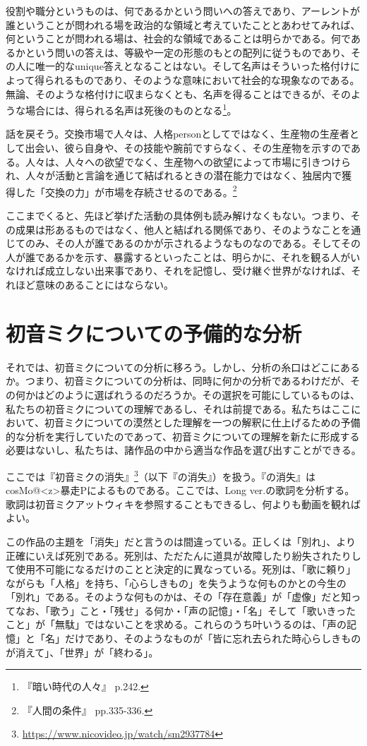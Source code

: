 \documentclass[b5j,twoside,twocolumn]{utarticle}
\begin{document}
役割や職分というものは、何であるかという問いへの答えであり、アーレントが誰ということが問われる場を政治的な領域と考えていたこととあわせてみれば、何ということが問われる場は、社会的な領域であることは明らかである。何であるかという問いの答えは、等級や一定の形態のもとの配列に従うものであり、その人に唯一的なunique答えとなることはない。そして名声はそういった格付けによって得られるものであり、そのような意味において社会的な現象なのである。無論、そのような格付けに収まらなくとも、名声を得ることはできるが、そのような場合には、得られる名声は死後のものとなる\footnote{『暗い時代の人々』 p.242.}。


話を戻そう。交換市場で人々は、人格personとしてではなく、生産物の生産者として出会い、彼ら自身や、その技能や腕前ですらなく、その生産物を示すのである。人々は、人々への欲望でなく、生産物への欲望によって市場に引きつけられ、人々が活動と言論を通じて結ばれるときの潜在能力ではなく、独居内で獲得した「交換の力」が市場を存続させるのである。\footnote{『人間の条件』 pp.335-336.}


ここまでくると、先ほど挙げた活動の具体例も読み解けなくもない。つまり、その成果は形あるものではなく、他人と結ばれる関係であり、そのようなことを通じてのみ、その人が誰であるのかが示されるようなものなのである。そしてその人が誰であるかを示す、暴露するといったことは、明らかに、それを観る人がいなければ成立しない出来事であり、それを記憶し、受け継ぐ世界がなければ、それほど意味のあることにはならない。


\section{初音ミクについての予備的な分析}
それでは、初音ミクについての分析に移ろう。しかし、分析の糸口はどこにあるか。つまり、初音ミクについての分析は、同時に何かの分析であるわけだが、その何かはどのように選ばれうるのだろうか。その選択を可能にしているものは、私たちの初音ミクについての理解であるし、それは前提である。私たちはここにおいて、初音ミクについての漠然とした理解を一つの解釈に仕上げるための予備的な分析を実行していたのであって、初音ミクについての理解を新たに形成する必要はないし、私たちは、諸作品の中から適当な作品を選び出すことができる。


ここでは『初音ミクの消失』\footnote{\url{https://www.nicovideo.jp/watch/sm2937784}}（以下『の消失』）を扱う。『の消失』はcosMo@\pbox<z>{暴走}Pによるものである。ここでは、Long ver.の歌詞を分析する。歌詞は初音ミクアットウィキを参照することもできるし、何よりも動画を観ればよい。


この作品の主題を「消失」だと言うのは間違っている。正しくは「別れ」、より正確にいえば死別である。死別は、ただたんに道具が故障したり紛失されたりして使用不可能になるだけのことと決定的に異なっている。死別は、「歌に頼り」ながらも「人格」を持ち、「心らしきもの」を失うような何ものかとの今生の「別れ」である。そのような何ものかは、その「存在意義」が「虚像」だと知ってなお、「歌う」こと・「残せ」る何か・「声の記憶」・「名」そして「歌いきったこと」が「無駄」ではないことを求める。これらのうち叶いうるのは、「声の記憶」と「名」だけであり、そのようなものが「皆に忘れ去られた時心らしきものが消えて」、「世界」が「終わる」。
\end{document}
